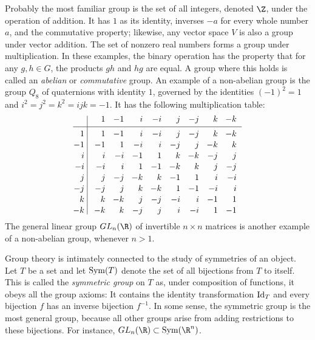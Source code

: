 Probably the most familiar group is the set of all integers, denoted $\Z$, under the operation of addition. It has $1$ as its identity, inverses $-a$ for every whole number $a$, and the commutative property; likewise, any vector space $V$ is also a group under vector addition. The set of nonzero real numbers forms a group under multiplication. In these examples, the binary operation has the property that for any $g,h\in G$, the products $gh$ and $hg$ are equal. A group where this holds is called an {\it abelian} or {\it commutative} group. An example of a non-abelian group is the group $Q_8$ of quaternions with identity $1$, governed by the identities $(-1)^2 = 1$ and $i^2 = j^2 = k^2 = ijk = -1$. It has the following multiplication table:
$$\vcenter{\vbox{\offinterlineskip
    \halign{
        \hfil $#$ & \hfil\vrule# \hfil \enskip &
        \hfil $\;#\;$ & \hfil $\;#\;$ & \hfil $\;#\;$ & \hfil $\;#\;$ &
        \hfil $\;#\;$ & \hfil $\;#\;$ & \hfil $\;#\;$ & \hfil $\;#\;$ \cr
        && 1 & -1 & i & -i & j & -j & k & - k \cr
        & height4pt &&&&&&& \cr
        \noalign{\hrule}
        & height4pt &&&&&&& \cr
        1 && 1 & -1 & i & -i & j & -j & k & - k \cr
        & height4pt &&&&&&& \cr
        -1 && -1 & 1 & -i & i & -j & j & -k & k \cr
        & height4pt &&&&&&& \cr
        i && i & -i & -1 & 1 & k & -k & -j & j \cr
        & height4pt &&&&&&& \cr
        -i && -i & i & 1 & -1 & -k & k & j & -j \cr
        & height4pt &&&&&&& \cr
        j && j & -j & -k & k & -1 & 1 & i & -i \cr
        & height4pt &&&&&&& \cr
        -j && -j & j & k & -k & 1 & -1 & -i & i \cr
        & height4pt &&&&&&& \cr
        k && k & -k & j & -j & -i & i & -1 & 1 \cr
        & height4pt &&&&&&& \cr
        -k && -k & k & -j & j & i & -i & 1 & -1 \cr
    }
}}$$
The general linear group $GL_n(\R)$ of invertible $n\times n$ matrices is another example of a non-abelian group, whenever $n>1$.

Group theory is intimately connected to the study of symmetries of an object. Let $T$ be a set and let $\mathop{\rm Sym}\nolimits(T)$ denote the set of all bijections from $T$ to itself. This is called the {\it symmetric group} on $T$ as, under composition of functions, it obeys all the group axioms: It contains the identity transformation $\mathop{\rm Id}\nolimits_T$ and every bijection $f$ has an inverse bijection $f^{-1}$. In some sense, the symmetric group is the most general group, because all other groups arise from adding restrictions to these bijections. For instance, $GL_n(\R) \subset \Sym(\R^n)$.

